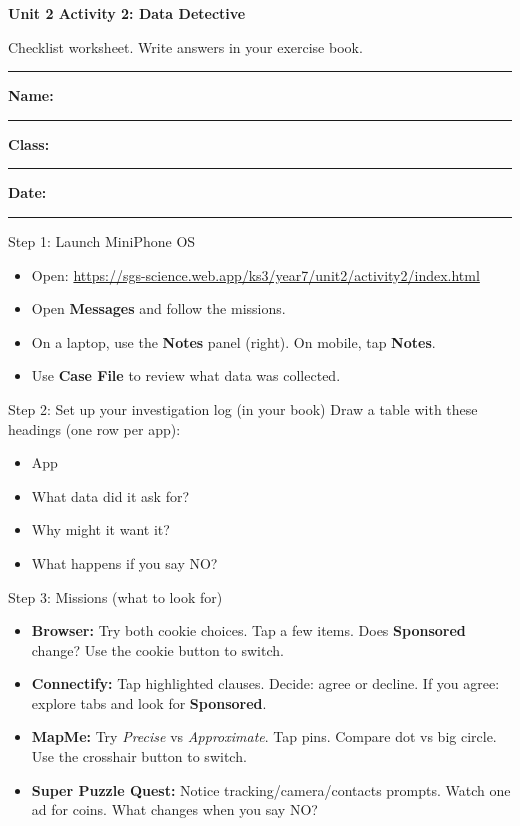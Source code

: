 \documentclass[10pt,a4paper]{article}
\newcommand{\NameLine}{\textbf{Name:} \rule{6.8cm}{0.4pt}\hfill \textbf{Class:} \rule{3cm}{0.4pt}\hfill \textbf{Date:} \rule{3cm}{0.4pt}}
\begin{document}
{\Large\bfseries\color{sgsNavy} Unit 2 Activity 2: Data Detective\par}
{\color{sgsGrey}Checklist worksheet. Write answers in your exercise book.\par}
\vspace{0.2em}
\hrule
\vspace{0.6em}
\NameLine

\vspace{0.6em}
\begin{StepBox}{Step 1: Launch MiniPhone OS}
\begin{itemize}[leftmargin=*,label=$\square$,nosep]
  \item Open: \url{https://sgs-science.web.app/ks3/year7/unit2/activity2/index.html}
  \item Open \textbf{Messages} and follow the missions.
  \item On a laptop, use the \textbf{Notes} panel (right). On mobile, tap \textbf{Notes}.
  \item Use \textbf{Case File} to review what data was collected.
\end{itemize}
\end{StepBox}

\begin{StepBox}{Step 2: Set up your investigation log (in your book)}
Draw a table with these headings (one row per app):
\begin{itemize}[leftmargin=*,label=$\square$,nosep]
  \item App
  \item What data did it ask for?
  \item Why might it want it?
  \item What happens if you say NO?
\end{itemize}
\end{StepBox}

\begin{StepBox}{Step 3: Missions (what to look for)}
\begin{itemize}[leftmargin=*,label=$\square$,nosep]
  \item \textbf{Browser:} Try both cookie choices. Tap a few items. Does \textbf{Sponsored} change? Use the cookie button to switch.
  \item \textbf{Connectify:} Tap highlighted clauses. Decide: agree or decline. If you agree: explore tabs and look for \textbf{Sponsored}.
  \item \textbf{MapMe:} Try \textit{Precise} vs \textit{Approximate}. Tap pins. Compare dot vs big circle. Use the crosshair button to switch.
  \item \textbf{Super Puzzle Quest:} Notice tracking/camera/contacts prompts. Watch one ad for coins. What changes when you say NO?
\end{itemize}
\end{StepBox}
\end{document}
